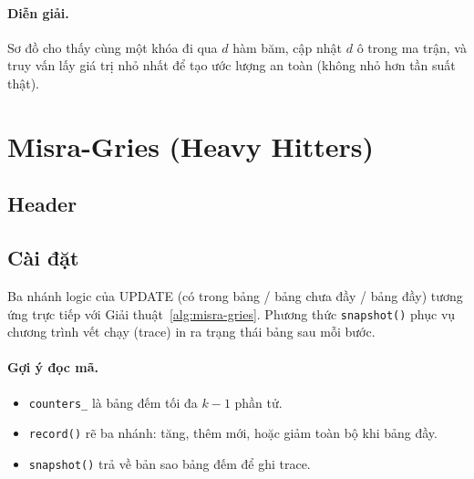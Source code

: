 \paragraph{Diễn giải.} Sơ đồ cho thấy cùng một khóa đi qua $d$ hàm băm, cập nhật $d$ ô trong ma trận, và truy vấn lấy giá trị nhỏ nhất để tạo ước lượng an toàn (không nhỏ hơn tần suất thật).

\section{Misra-Gries (Heavy Hitters)}

\subsection{Header}



\subsection{Cài đặt}

Ba nhánh logic của UPDATE (có trong bảng / bảng chưa đầy / bảng đầy) tương ứng trực tiếp với Giải thuật~\ref{alg:misra-gries}. Phương thức \texttt{snapshot()} phục vụ chương trình vết chạy (trace) in ra trạng thái bảng sau mỗi bước.



\paragraph{Gợi ý đọc mã.}
\begin{itemize}
    \item \texttt{counters\_} là bảng đếm tối đa $k-1$ phần tử.
    \item \texttt{record()} rẽ ba nhánh: tăng, thêm mới, hoặc giảm toàn bộ khi bảng đầy.
    \item \texttt{snapshot()} trả về bản sao bảng đếm để ghi trace.
\end{itemize}

